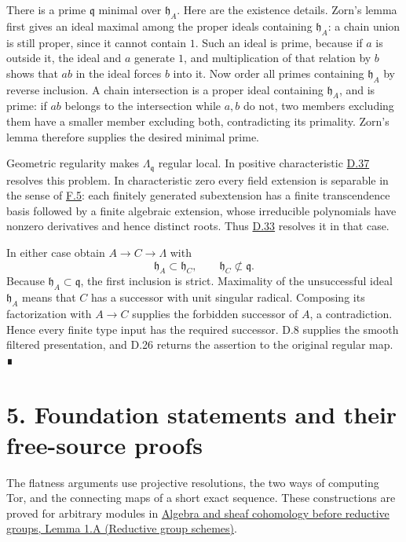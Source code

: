 \documentclass[11pt,a4paper,openany]{report}
\begin{document}
There is a prime \(\mathfrak q\) minimal over \(\mathfrak h_A\). Here are the existence details. Zorn's lemma first gives an ideal maximal among the proper ideals containing \(\mathfrak h_A\): a chain union is still proper, since it cannot contain \(1\). Such an ideal is prime, because if \(a\) is outside it, the ideal and \(a\) generate \(1\), and multiplication of that relation by \(b\) shows that \(ab\) in the ideal forces \(b\) into it. Now order all primes containing \(\mathfrak h_A\) by reverse inclusion. A chain intersection is a proper ideal containing \(\mathfrak h_A\), and is prime: if \(ab\) belongs to the intersection while \(a,b\) do not, two members excluding them have a smaller member excluding both, contradicting its primality. Zorn's lemma therefore supplies the desired minimal prime.

Geometric regularity makes \(\Lambda_{\mathfrak q}\) regular local. In positive characteristic \hyperref[AG-RG-S05-smoothing-lemma-resolve-general]{D.37} resolves this problem. In characteristic zero every field extension is separable in the sense of \hyperref[AG-RG-S05-algebra-definition-separable-field-extension]{F.5}: each finitely generated subextension has a finite transcendence basis followed by a finite algebraic extension, whose irreducible polynomials have nonzero derivatives and hence distinct roots. Thus \hyperref[AG-RG-S05-smoothing-lemma-resolve-special]{D.33} resolves it in that case.

In either case obtain \(A\to C\to\Lambda\) with \[
\mathfrak h_A\subset\mathfrak h_C,\qquad
\mathfrak h_C\not\subset\mathfrak q.
\] Because \(\mathfrak h_A\subset\mathfrak q\), the first inclusion is strict. Maximality of the unsuccessful ideal \(\mathfrak h_A\) means that \(C\) has a successor with unit singular radical. Composing its factorization with \(A\to C\) supplies the forbidden successor of \(A\), a contradiction. Hence every finite type input has the required successor. D.8 supplies the smooth filtered presentation, and D.26 returns the assertion to the original regular map. ∎

\section{5. Foundation statements and their free-source proofs}\label{AG-RG-S05-foundation-statements-and-their-free-source-proofs}

The flatness arguments use projective resolutions, the two ways of computing Tor, and the connecting maps of a short exact sequence. These constructions are proved for arbitrary modules in \href{https://github.com/KokunoYumeto/open-math-courses/blob/main/docs/courses/AG-RG/AG-RG-S01.md\#tor-calculus}{Algebra and sheaf cohomology before reductive groups, Lemma 1.A (Reductive group schemes)}.
\end{document}
